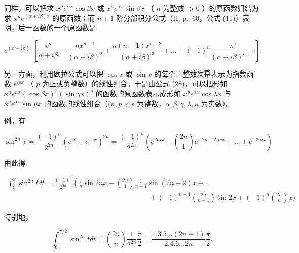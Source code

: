 同样，可以把求 \(x^n e^{\alpha x} \cos \beta x\) 或 \(x^n e^{\alpha x} \sin \beta x\) （ \(n\) 为整数 \(> 0\) ）的原函数归结为求 \(x^n e^{(\alpha + i\beta)x}\) 的原函数；而 \(n + 1\) 阶分部积分公式（II, p.~60，公式 (11)）表明，后一函数的一个原函数是

\[
e ^ {(\alpha + i \beta) x} \left[ \frac {x ^ {n}}{\alpha + i \beta} - \frac {n x ^ {n - 1}}{(\alpha + i \beta) ^ {2}} + \frac {n (n - 1) x ^ {n - 2}}{(\alpha + i \beta) ^ {3}} + \dots + (- 1) ^ {n} \frac {n !}{(\alpha + i \beta) ^ {n + 1}} \right].
\]

另一方面，利用欧拉公式可以把 \(\cos x\) 或 \(\sin x\) 的每个正整数次幂表示为指数函数 \(e^{ipx}\) （ \(p\) 为正或负整数）的线性组合。于是由公式 (28)，可以把形如 \(x^n e^{\alpha x}(\cos \beta x)^r (\sin \gamma x)^s\) 的函数的原函数表示成形如 \(x^p e^{\alpha x}\cos \lambda x\) 与 \(x^p e^{\alpha x}\sin \mu x\) 的函数的线性组合（\((n, p, r, s\) 为整数，\(\alpha, \beta, \gamma, \lambda, \mu\) 为实数）。

例。有

\[
\sin^ {2 n} x = \frac {(- 1) ^ {n}}{2 ^ {2 n}} \left(e ^ {i x} - e ^ {- i x}\right) ^ {2 n} = \frac {(- 1) ^ {n}}{2 ^ {2 n}} \left(e ^ {2 n i x} - \binom {2 n} {1} e ^ {(2 n - 2) i x} + \dots + e ^ {- 2 n i x}\right)
\]

由此得

\[
\begin{array}{l} \int_ {0} ^ {x} \sin^ {2 n} t d t = \frac {(- 1) ^ {n}}{2 ^ {2 n}} \left(\frac {1}{n} \sin 2 n x - \binom {2 n} {1} \frac {1}{n - 1} \sin (2 n - 2) x + \dots \right. \\ \qquad \qquad \qquad \qquad \qquad \qquad \qquad \qquad \qquad \qquad + (- 1) ^ {n - 1} \binom {2 n} {n - 1} \sin 2 x + (- 1) ^ {n} \binom {2 n} {n} x \Bigg) \end{array}
\]

特别地，

\[
\int_ {0} ^ {\pi / 2} \sin^ {2 n} t   d t = \binom {2 n} {n} \frac {1}{2 ^ {2 n}}   \frac {\pi}{2} = \frac {1 . 3 . 5 \ldots (2 n - 1)}{2 . 4 . 6 \ldots 2 n}   \frac {\pi}{2}.\tag{29}
\]

